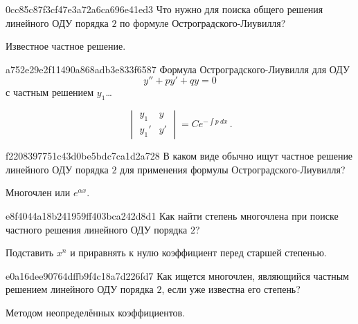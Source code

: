 \begin{note}{0cc85c87f3cf47e3a72a6ca696e41ed3}
    Что нужно для поиска общего решения линейного ОДУ порядка \({ 2 }\) по формуле Остроградского-Лиувилля?

    \begin{cloze}{1}
        Известное частное решение.
    \end{cloze}
\end{note}

\begin{note}{a752e29e2f11490a868adb3e833f6587}
    Формула Остроградского-Лиувилля для ОДУ
    \[
        y'' + py' + qy = 0
    \]
    с частным решением \({ y_1 }\)\ldots

    \begin{cloze}{1}
        \[
            \begin{vmatrix}
                y_1 & y \\
                y_1' & y'
            \end{vmatrix} = Ce^{-\int p\: dx}\,.
        \]
    \end{cloze}
\end{note}

\begin{note}{f2208397751c43d0be5bdc7ca1d2a728}
    В каком виде обычно ищут частное решение линейного ОДУ порядка \({ 2 }\) для применения формулы Остроградского-Лиувилля?

    \begin{cloze}{1}
        Многочлен или \({ e^{\alpha x} }\).
    \end{cloze}
\end{note}

\begin{note}{e8f4044a18b241959ff403bca242d8d1}
    Как найти степень многочлена при поиске частного решения линейного ОДУ порядка \({ 2 }\)?

    \begin{cloze}{1}
        Подставить \({ x^{n} }\) и приравнять к нулю коэффициент перед старшей степенью.
    \end{cloze}
\end{note}

\begin{note}{e0a16dee90764dffb9f4c18a7d226fd7}
    Как ищется многочлен, являющийся частным решением линейного ОДУ порядка \({ 2 }\), если уже известна его степень?

    \begin{cloze}{1}
        Методом неопределённых коэффициентов.
    \end{cloze}
\end{note}


